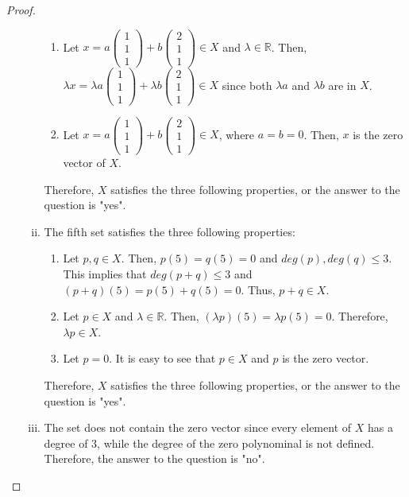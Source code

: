 \begin{proof}
\begin{enumerate}[(a)]
\begin{enumerate}[(i)]
\begin{enumerate}[(1)]
            \item Let $x = a\begin{pmatrix}1\\1\\1\end{pmatrix}+b\begin{pmatrix}2\\1\\1\end{pmatrix}\in X$ and $\lambda\in\mathbb{R}$. Then, $\lambda x = \lambda a\begin{pmatrix}1\\1\\1\end{pmatrix}+\lambda b\begin{pmatrix}2\\1\\1\end{pmatrix}\in X$ since both $\lambda a$ and $\lambda b$ are in $X$.
            \item Let $x = a\begin{pmatrix}1\\1\\1\end{pmatrix}+b\begin{pmatrix}2\\1\\1\end{pmatrix}\in X$, where $a = b = 0$. Then, $x$ is the zero vector of $X$.
        \end{enumerate}
        Therefore, $X$ satisfies the three following properties, or the answer to the question is "yes".
        \item The fifth set satisfies the three following properties:
        \begin{enumerate}[(1)]
            \item Let $p, q\in X$. Then, $p(5) = q(5) = 0$ and $deg(p), deg(q)\leq 3$. This implies that $deg(p + q)\leq 3$ and $(p+q)(5)=p(5)+q(5)=0$. Thus, $p+q\in X$.
            \item Let $p\in X$ and $\lambda\in\mathbb{R}$. Then, $(\lambda p)(5)=\lambda p(5)=0$. Therefore, $\lambda p\in X$.
            \item Let $p=0$. It is easy to see that $p\in X$ and $p$ is the zero vector.
        \end{enumerate}
        Therefore, $X$ satisfies the three following properties, or the answer to the question is "yes".
        \item The set does not contain the zero vector since every element of $X$ has a degree of 3, while the degree of the zero polynominal is not defined. Therefore, the answer to the question is "no".
    \end{enumerate}

\end{enumerate}
\end{proof}